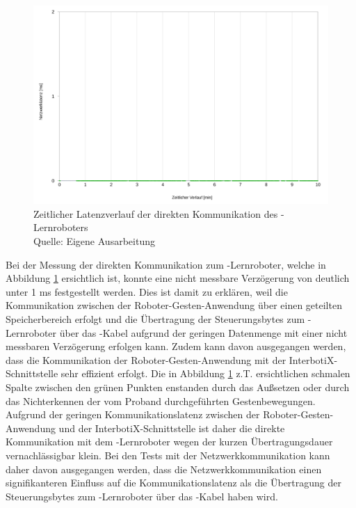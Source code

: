 \begin{figure}[htb]
	\centering
	\includegraphics[width=1.04\textwidth]{images/ergebnisse/Messung_der_direkten_Kommunikation}
	\caption[Zeitlicher Latenzverlauf der direkten Kommunikation des -Lernroboters]{Zeitlicher Latenzverlauf der direkten Kommunikation des -Lernroboters\\Quelle: Eigene Ausarbeitung}
	\label{fig:measurement_robot_direct_communication}
\end{figure}
\FloatBarrier

Bei der Messung der direkten Kommunikation zum -Lernroboter, welche in Abbildung \ref{fig:measurement_robot_direct_communication} ersichtlich ist, konnte eine nicht messbare Verzögerung von deutlich unter 1 ms festgestellt werden. Dies ist damit zu erklären, weil die Kommunikation zwischen der Roboter-Gesten-Anwendung über einen geteilten Speicherbereich erfolgt und die Übertragung der Steuerungsbytes zum -Lernroboter über das -Kabel aufgrund der geringen Datenmenge mit einer nicht messbaren Verzögerung erfolgen kann. Zudem kann davon ausgegangen werden, dass die Kommunikation der Roboter-Gesten-Anwendung mit der InterbotiX-Schnittstelle sehr effizient erfolgt. Die in Abbildung \ref{fig:measurement_robot_direct_communication} z.T. ersichtlichen schmalen Spalte zwischen den grünen Punkten enstanden durch das Außsetzen oder durch das Nichterkennen der vom Proband durchgeführten Gestenbewegungen. Aufgrund der geringen Kommunikationslatenz zwischen der Roboter-Gesten-Anwendung und der InterbotiX-Schnittstelle ist daher die direkte Kommunikation mit dem -Lernroboter wegen der kurzen Übertragungsdauer vernachlässigbar klein. Bei den Tests mit der Netzwerkkommunikation kann daher davon ausgegangen werden, dass die Netzwerkkommunikation einen signifikanteren Einfluss auf die Kommunikationslatenz als die Übertragung der Steuerungsbytes zum -Lernroboter über das -Kabel haben wird.

